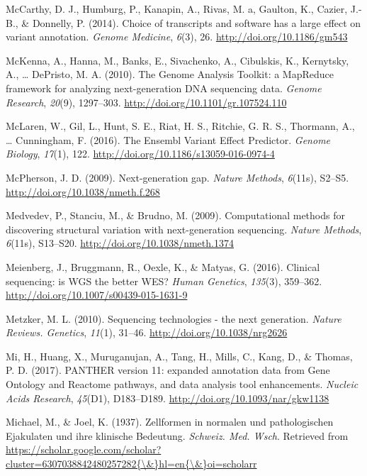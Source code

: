 \documentclass[12pt,twoside]{reedthesis}
\theoremstyle{definition}
\theoremstyle{definition}
\theoremstyle{remark}
\begin{document}
  \hypertarget{ref-McCarthy2014}{}
  McCarthy, D. J., Humburg, P., Kanapin, A., Rivas, M. a, Gaulton, K.,
  Cazier, J.-B., \& Donnelly, P. (2014). Choice of transcripts and
  software has a large effect on variant annotation. \emph{Genome
  Medicine}, \emph{6}(3), 26. \url{http://doi.org/10.1186/gm543}
  
  \hypertarget{ref-McKenna2010}{}
  McKenna, A., Hanna, M., Banks, E., Sivachenko, A., Cibulskis, K.,
  Kernytsky, A., \ldots{} DePristo, M. A. (2010). The Genome Analysis
  Toolkit: a MapReduce framework for analyzing next-generation DNA
  sequencing data. \emph{Genome Research}, \emph{20}(9), 1297--303.
  \url{http://doi.org/10.1101/gr.107524.110}
  
  \hypertarget{ref-McLaren2016}{}
  McLaren, W., Gil, L., Hunt, S. E., Riat, H. S., Ritchie, G. R. S.,
  Thormann, A., \ldots{} Cunningham, F. (2016). The Ensembl Variant Effect
  Predictor. \emph{Genome Biology}, \emph{17}(1), 122.
  \url{http://doi.org/10.1186/s13059-016-0974-4}
  
  \hypertarget{ref-McPherson2009}{}
  McPherson, J. D. (2009). Next-generation gap. \emph{Nature Methods},
  \emph{6}(11s), S2--S5. \url{http://doi.org/10.1038/nmeth.f.268}
  
  \hypertarget{ref-Medvedev2009}{}
  Medvedev, P., Stanciu, M., \& Brudno, M. (2009). Computational methods
  for discovering structural variation with next-generation sequencing.
  \emph{Nature Methods}, \emph{6}(11s), S13--S20.
  \url{http://doi.org/10.1038/nmeth.1374}
  
  \hypertarget{ref-Meienberg2016}{}
  Meienberg, J., Bruggmann, R., Oexle, K., \& Matyas, G. (2016). Clinical
  sequencing: is WGS the better WES? \emph{Human Genetics}, \emph{135}(3),
  359--362. \url{http://doi.org/10.1007/s00439-015-1631-9}
  
  \hypertarget{ref-Metzker2010}{}
  Metzker, M. L. (2010). Sequencing technologies - the next generation.
  \emph{Nature Reviews. Genetics}, \emph{11}(1), 31--46.
  \url{http://doi.org/10.1038/nrg2626}
  
  \hypertarget{ref-Mi2017}{}
  Mi, H., Huang, X., Muruganujan, A., Tang, H., Mills, C., Kang, D., \&
  Thomas, P. D. (2017). PANTHER version 11: expanded annotation data from
  Gene Ontology and Reactome pathways, and data analysis tool
  enhancements. \emph{Nucleic Acids Research}, \emph{45}(D1), D183--D189.
  \url{http://doi.org/10.1093/nar/gkw1138}
  
  \hypertarget{ref-Michael1937}{}
  Michael, M., \& Joel, K. (1937). Zellformen in normalen und
  pathologischen Ejakulaten und ihre klinische Bedeutung. \emph{Schweiz.
  Med. Wsch}. Retrieved from
  \href{https://scholar.google.com/scholar?cluster=6307038842480257282\%7B/\&\%7Dhl=en\%7B/\&\%7Doi=scholarr}{https://scholar.google.com/scholar?cluster=6307038842480257282\{\textbackslash{}\&\}hl=en\{\textbackslash{}\&\}oi=scholarr}
  
\end{document}
